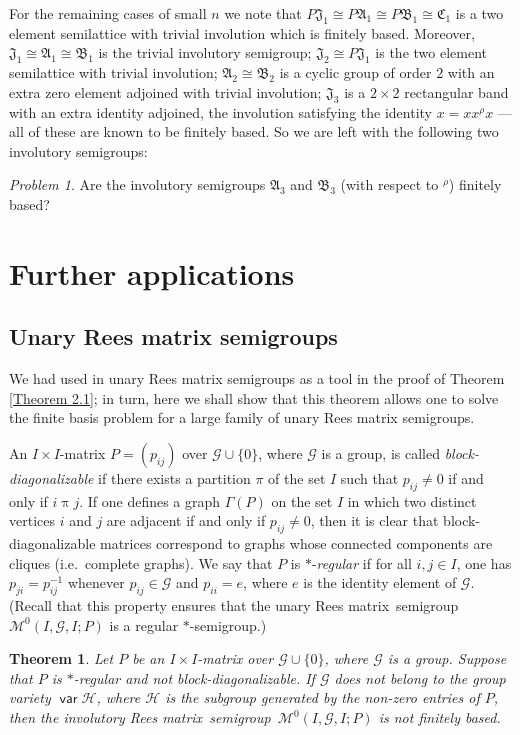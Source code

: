 \documentclass[preprint,1p,times]{elsarticle}
\DeclareMathOperator{\var}{\mathsf{var}}
\numberwithin{equation}{section}
\newtheorem{Thm}{Theorem}[section]
\theoremstyle{remark}
\newtheorem{Problem}{Problem}[section]
\def\cal{\mathcal}
\def\Mc{{\cal M}}
\def\m{\mathrel}
\def\Rm{Rees matrix}
\def\sm{semi\-group}
\def\A{\mathfrak{A}}
\def\C{\mathfrak{C}}
\def\B{\mathfrak{B}}
\def\J{\mathfrak{J}}
\begin{document}
For the remaining cases of small $n$ we note that $P\J_1\cong P\A_1\cong P\B_1\cong \C_1$ is a two element semilattice
with trivial involution which is finitely based. Moreover, $\J_1\cong \A_1\cong \B_1$ is the trivial involutory
semigroup; $\J_2\cong P\J_1$ is the two element semilattice with trivial involution; $\A_2\cong \B_2$ is a cyclic group
of order $2$ with an extra zero element adjoined with trivial involution; $\J_3$ is a $2\times 2$ rectangular band with
an extra identity adjoined, the involution satisfying the identity $x=xx^\rho x$ --- all of these are known to be
finitely based. So we are left with the following two involutory semigroups:

\begin{Problem} Are the involutory semigroups $\A_3$ and $\B_3$ (with respect to $^\rho$) finitely based?
\end{Problem}

\section{Further applications}

\subsection{Unary Rees matrix semigroups}

We had used in \cite{adv} unary Rees matrix semigroups as a tool in the proof of Theorem \ref{Theorem 2.1}; in turn,
here we shall show that this theorem allows one to solve the finite basis problem for a large family of unary Rees
matrix semigroups.

An $I\times I$-matrix $P=(p_{ij})$ over $\mathcal{G}\cup\{0\}$, where $\mathcal{G}$ is a group, is called
\emph{block-diagonalizable} if there exists a partition $\pi$ of the set $I$ such that $p_{ij}\ne 0$ if and only if
$i\m{\pi}j$. If one defines a graph $\Gamma(P)$ on the set $I$ in which two distinct vertices $i$ and $j$ are adjacent
if and only if $p_{ij}\ne0$, then it is clear that block-diagonalizable matrices correspond to graphs whose connected
components are cliques (i.e.\ complete graphs). We say that $P$ is $*$-\emph{regular} if for all $i,j\in I$, one has
$p_{ji}=p_{ij}^{-1}$ whenever $p_{ij}\in \mathcal{G}$ and $p_{ii}=e$, where $e$ is the identity element of
$\mathcal{G}$. (Recall that this property ensures that the unary \Rm\ \sm\ $\Mc^0(I,\mathcal{G},I;P)$ is a regular
$*$-semigroup.)

\begin{Thm}
\label{Rees matrix} Let $P$ be an $I\times I$-matrix over $\mathcal{G}\cup\{0\}$, where $\mathcal{G}$ is a group.
Suppose that $P$ is $*$-regular and not block-diagonalizable. If $\mathcal{G}$ does not belong to the group variety
$\var\mathcal{H}$, where $\mathcal{H}$ is the subgroup generated by the non-zero entries of $P$, then the involutory \Rm\
\sm\ $\Mc^0(I,\mathcal{G},I;P)$ is not finitely based.
\end{Thm}
\end{document}
